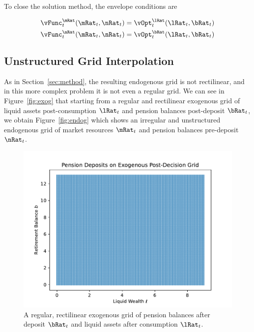 \documentclass[\econtexRoot/SequentialEGM]{subfiles}
\begin{document}
To close the solution method, the envelope conditions are

\begin{equation}
	\begin{split}
		\vFunc_{t}^{\mRat}(\mRat_{t}, \nRat_{t}) & =
		\vOpt_{t}^{\lRat}(\lRat_{t}, \bRat_{t}) \\
		\vFunc_{t}^{\nRat}(\mRat_{t}, \nRat_{t}) & =
		\vOpt_{t}^{\bRat}(\lRat_{t}, \bRat_{t})
	\end{split}
\end{equation}

\subsection{Unstructured Grid Interpolation}

As in Section~\ref{sec:method}, the resulting endogenous grid is not rectilinear, and in this more complex problem it is not even a regular grid. We can see in Figure~\ref{fig:exog} that starting from a regular and rectilinear exogenous grid of liquid assets post-consumption $\lRat_{t}$ and pension balances post-deposit $\bRat_{t}$, we obtain Figure~\ref{fig:endog} which shows an irregular and unstructured endogenous grid of market resources $\mRat_{t}$ and pension balances pre-deposit $\nRat_{t}$.

\begin{figure}
	\centering
	\includegraphics[width=0.8\linewidth]{Figures/ExogenousGrid.pdf}
	\caption{A regular, rectilinear exogenous grid of pension balances after deposit $\bRat_{t}$ and liquid assets after consumption $\lRat_{t}$.}
	\notinsubfile{\label{fig:exog}}
\end{figure}
\end{document}
